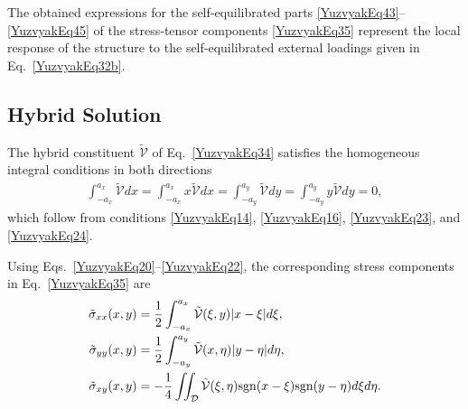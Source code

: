 The obtained expressions for the self‑equilibrated parts \eqref{YuzvyakEq43}--\eqref{YuzvyakEq45} of the stress‑tensor components \eqref{YuzvyakEq35} represent the local response of the structure to the self‑equilibrated external loadings given in Eq.~\eqref{YuzvyakEq32b}.

\subsection{Hybrid Solution}

The hybrid constituent $\tilde{\mathcal{V}}$ of Eq.~\eqref{YuzvyakEq34} satisfies the homogeneous integral conditions in both directions  
\begin{align}
	\int_{-a_x}^{a_x}\tilde{\mathcal{V}} dx
	=\int_{-a_x}^{a_x}x \tilde{\mathcal{V}} dx
	=\int_{-a_y}^{a_y}\tilde{\mathcal{V}} dy
	=\int_{-a_y}^{a_y}y \tilde{\mathcal{V}} dy
	=0,
	\label{YuzvyakEq46}
\end{align}
which follow from conditions \eqref{YuzvyakEq14}, \eqref{YuzvyakEq16}, \eqref{YuzvyakEq23}, and \eqref{YuzvyakEq24}.

Using Eqs.~\eqref{YuzvyakEq20}--\eqref{YuzvyakEq22}, the corresponding stress components in Eq.~\eqref{YuzvyakEq35} are
\begin{align}
	\tilde{\sigma}_{xx}(x,y)
	&=\frac{1}{2}\int_{-a_x}^{a_x}\tilde{\mathcal{V}}(\xi ,y) |x-\xi| d\xi,
	\notag\\
	\tilde{\sigma}_{yy}(x,y)
	&=\frac{1}{2}\int_{-a_y}^{a_y}\tilde{\mathcal{V}}(x,\eta) |y-\eta| d\eta,
	\notag\\
	\tilde{\sigma}_{xy}(x,y)
	&=-\frac{1}{4}\iint_{\mathcal D}
	\tilde{\mathcal{V}}(\xi ,\eta )
	 \mathrm{sgn}(x-\xi) \mathrm{sgn}(y-\eta)
	 d\xi d\eta.
	\label{YuzvyakEq47}
\end{align}

